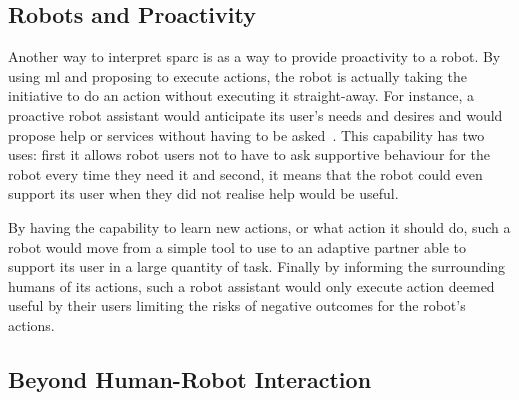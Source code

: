 

\subsection{Robots and Proactivity}
Another way to interpret \gls{sparc} is as a way to provide proactivity to a robot. By using \gls{ml} and proposing to execute actions, the robot is actually taking the initiative to do an action without executing it straight-away. For instance, a proactive robot assistant would anticipate its user's needs and desires and would propose help or services without having to be asked~\citep{mason2011robot}. This capability has two uses: first it allows robot users not to have to ask supportive behaviour for the robot every time they need it and second, it means that the robot could even support its user when they did not realise help would be useful.

By having the capability to learn new actions, or what action it should do, such a robot would move from a simple tool to use to an adaptive partner able to support its user in a large quantity of task. Finally by informing the surrounding humans of its actions, such a robot assistant would only execute action deemed useful by their users limiting the risks of negative outcomes for the robot's actions.

\subsection{Beyond Human-Robot Interaction}\label{sec:disc_beyond}


